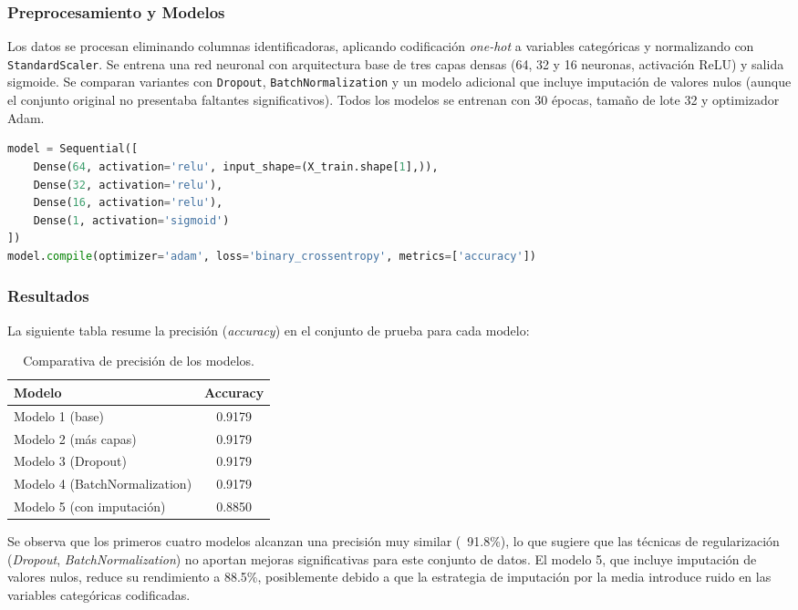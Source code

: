 \documentclass[12pt]{article}
\begin{document}
\subsubsection*{Preprocesamiento y Modelos}

Los datos se procesan eliminando columnas identificadoras, aplicando codificación \textit{one-hot} a variables categóricas y normalizando con \texttt{StandardScaler}. Se entrena una red neuronal con arquitectura base de tres capas densas (64, 32 y 16 neuronas, activación ReLU) y salida sigmoide. Se comparan variantes con \texttt{Dropout}, \texttt{BatchNormalization} y un modelo adicional que incluye imputación de valores nulos (aunque el conjunto original no presentaba faltantes significativos). Todos los modelos se entrenan con 30 épocas, tamaño de lote 32 y optimizador Adam.

\begin{lstlisting}[language=Python, caption={Arquitectura base del modelo}, label={lst:modelo_base}]
model = Sequential([
    Dense(64, activation='relu', input_shape=(X_train.shape[1],)),
    Dense(32, activation='relu'),
    Dense(16, activation='relu'),
    Dense(1, activation='sigmoid')
])
model.compile(optimizer='adam', loss='binary_crossentropy', metrics=['accuracy'])
\end{lstlisting}

\subsubsection*{Resultados}

La siguiente tabla resume la precisión (\textit{accuracy}) en el conjunto de prueba para cada modelo:

\begin{table}[htbp]
\centering
\caption{Comparativa de precisión de los modelos.}
\label{tab:attrition_models}
\begin{tabular}{l c}
\toprule
\textbf{Modelo} & \textbf{Accuracy} \\
\midrule
Modelo 1 (base) & 0.9179 \\
Modelo 2 (más capas) & 0.9179 \\
Modelo 3 (Dropout) & 0.9179 \\
Modelo 4 (BatchNormalization) & 0.9179 \\
Modelo 5 (con imputación) & 0.8850 \\
\bottomrule
\end{tabular}
\end{table}

Se observa que los primeros cuatro modelos alcanzan una precisión muy similar (~91.8\%), lo que sugiere que las técnicas de regularización (\textit{Dropout}, \textit{BatchNormalization}) no aportan mejoras significativas para este conjunto de datos. El modelo 5, que incluye imputación de valores nulos, reduce su rendimiento a 88.5\%, posiblemente debido a que la estrategia de imputación por la media introduce ruido en las variables categóricas codificadas.
\end{document}
